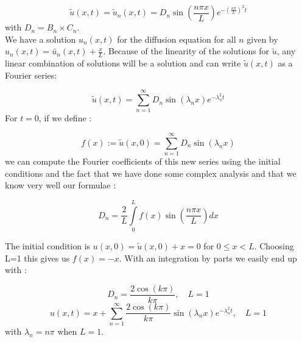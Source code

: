 \documentclass[a4paper, twoside, 11pt]{report}
\theoremstyle{theorem}
\theoremstyle{remark}
\theoremstyle{exemple}
\begin{document}
                    \begin{equation*}
                        \widetilde{u}(x,t)=\widetilde{u}_n(x,t)=D_n\sin(\frac{n\pi x}{L})e^{-\left(\frac{n\pi}{L}\right)^2t}
                    \end{equation*}
                with $D_n = B_n \times C_n$.\\
                We have a solution $u_n(x,t)$ for the diffusion equation for all $n$ given by $u_n(x,t)=\widetilde{u_n}(x,t)+\frac{x}{L}$. Because of the linearity of the solutions for $\widetilde{u}$, any linear combination of solutions will be a solution and can write $\widetilde{u}(x,t)$ as a Fourier series:

                    \begin{equation*}
                        \widetilde{u}(x,t)=\sum\limits_{n=1}^{\infty}D_n \sin(\lambda_n x)e^{-\lambda_n^2t}
                    \end{equation*}
                For $t=0$, if we define :

                    \begin{equation*}
                        f(x):=\widetilde{u}(x,0) =\sum\limits_{n=1}^{\infty}D_n\sin(\lambda_nx)
                    \end{equation*}
                we can compute the Fourier coefficients of this new series using the initial conditions and the fact that we have done some complex analysis and that we know very well our formulae :

                    \begin{equation*}
                        D_n=\frac{2}{L}\int\limits_{0}^{L}f(x)\sin(\frac{n\pi x}{L})dx
                    \end{equation*}

                The initial condition is $u(x,0)=\widetilde{u}(x,0)+x=0$ for $0\leq x<L$. Choosing L=1 this gives us $f(x)=-x$. With an integration by parts we easily end up with :

                    \begin{equation*}
                        D_n = \frac{2\cos(k\pi)}{k\pi},  \quad L=1
                    \end{equation*}
                    \begin{equation*}
                        u(x,t)=x + \sum\limits_{n=1}^{\infty}\frac{2\cos(k\pi)}{k\pi}\sin(\lambda_nx)e^{-\lambda_n^2t}, \quad L=1
                    \end{equation*}
                    with $\lambda_n = n\pi$ when $L=1$.
\end{document}
